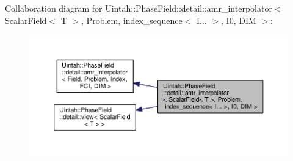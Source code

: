 Collaboration diagram for Uintah\+:\+:Phase\+Field\+:\+:detail\+:\+:amr\+\_\+interpolator$<$ Scalar\+Field$<$ T $>$, Problem, index\+\_\+sequence$<$ I... $>$, I0, D\+IM $>$\+:\nopagebreak
\begin{figure}[H]
\begin{center}
\leavevmode
\includegraphics[width=350pt]{classUintah_1_1PhaseField_1_1detail_1_1amr__interpolator_3_01ScalarField_3_01T_01_4_00_01Problem6ba9a5949addff795f5d319ffd2479c9}
\end{center}
\end{figure}
